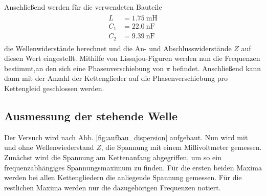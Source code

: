 Anschließend werden für die verwendeten Bauteile
\begin{align}
\begin{aligned}
  L&=\SI{1,75}{\milli\henry}\\
  C_1&=\SI{22,0}{\nano\farad}\\
  C_2&=\SI{9,39}{\nano\farad}
\end{aligned}
\end{align}
die Wellenwiderstände berechnet %
und die An- und Abschlusswiderstände $Z$ auf diesen Wert eingestellt.
Mithilfe von Lissajou-Figuren werden nun die Frequenzen bestimmt,an den sich eine Phasenverschiebung von $\pi$ %
befindet. Anschließend kann dann mit der Anzahl der Kettenglieder auf die %
Phasenverschiebung pro Kettengleid geschlossen werden.

\subsection{Ausmessung der stehende Welle}
Der Versuch wird nach Abb. \ref{fig:aufbau_dispersion} aufgebaut.
Nun wird mit und ohne Wellenwiederstand $Z$, die Spannung mit einem Millivoltmeter gemessen. %
Zunächst wird die Spannung am Kettenanfang abgegriffen, um so ein frequenzabhängiges Spannungsmaximum
zu finden. Für die ersten beiden Maxima werden bei allen Kettengliedern die anliegende Spannung gemessen. %
Für die restlichen Maxima werden nur die dazugehörigen Frequenzen notiert.

